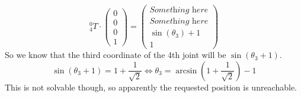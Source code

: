 \documentclass[10pt,a4paper]{article}
\begin{document}
\begin{equation*}
  {}_{4}^{0}T \cdot \begin{pmatrix}
    0\\0\\0\\1
  \end{pmatrix} = \begin{pmatrix}
    \textit{Something here}\\
    \textit{Something here}\\
    \sin(\theta_{3}) + 1\\
    1
  \end{pmatrix}
\end{equation*}
So we know that the third coordinate of the 4th joint will be $\sin(\theta_{3} + 1)$.
\begin{equation*}
  \sin(\theta_{3} + 1) = 1 + \frac{1}{\sqrt{2}} \Leftrightarrow \theta_{3} = \arcsin\left( 1 + \frac{1}{\sqrt{2}} \right) - 1
\end{equation*}
This is not solvable though, so apparently the requested position is unreachable.
\end{document}
